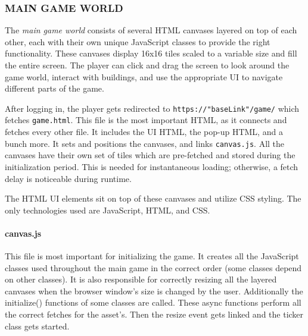 \documentclass[12pt]{article}
\begin{document}
\subsubsection{MAIN GAME WORLD}
The \textit{main game world} consists of several HTML canvases layered on top of each other, each with their own unique
JavaScript classes to provide the right functionality. These canvases display 16x16 tiles scaled to a variable size and
fill the entire screen. The player can click and drag the screen to look around the game world, interact with buildings,
and use the appropriate UI to navigate different parts of the game.

After logging in, the player gets redirected to \texttt{https://"baseLink"/game/} which fetches \texttt{game.html}. This
file is the most important HTML, as it connects and fetches every other file. It includes the UI HTML, the pop-up HTML, and a bunch more.
It sets and positions the canvases, and links \texttt{canvas.js}. All the canvases have their own set of tiles which are
pre-fetched and stored during the initialization period. This is needed for instantaneous loading; otherwise, a fetch
delay is noticeable during runtime.

The HTML UI elements sit on top of these canvases and utilize CSS styling. The only technologies used are JavaScript,
HTML, and CSS.


\paragraph{canvas.js} This file is most important for initializing the game. It creates all the JavaScript classes used
throughout the main game in the correct order (some classes depend on other classes). It is also responsible for
correctly resizing all the layered canvases when the browser window's size is changed by the user. Additionally the
initialize() functions of some classes are called. These async functions perform all the correct fetches for the
asset's. Then the resize event gets linked and the ticker class gets started.
\end{document}
